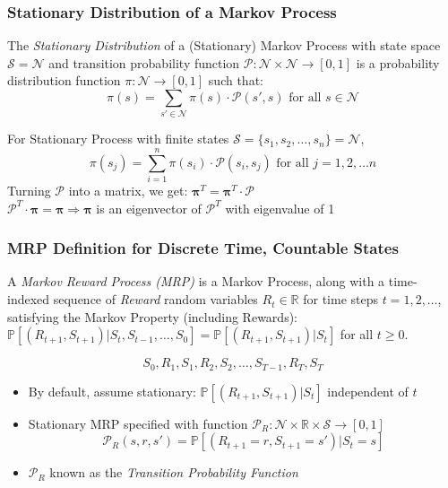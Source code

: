 \documentclass[handout]{beamer}
\begin{document}
\begin{frame}
\frametitle{Stationary Distribution of a Markov Process}
\pause
\begin{definition} 
 The {\em Stationary Distribution} of a (Stationary) Markov Process with state space $\mathcal{S} = \mathcal{N}$ and transition probability function $\mathcal{P}: \mathcal{N} \times \mathcal{N} \rightarrow [0, 1]$ is a probability distribution function $\pi: \mathcal{N} \rightarrow [0, 1]$ such that:
  $$\pi(s) = \sum_{s'\in \mathcal{N}} \pi(s) \cdot \mathcal{P}(s', s) \text{ for all } s \in \mathcal{N}$$
\end{definition}
\pause
For Stationary Process with finite states $\mathcal{S} = \{s_1, s_2, \ldots, s_n\} = \mathcal{N}$,
$$\pi(s_j) = \sum_{i=1}^n \pi(s_i) \cdot \mathcal{P}(s_i, s_j) \text{ for all } j = 1, 2, \ldots n$$
\pause
Turning $\mathcal{P}$ into a matrix, we get: $\bm{\pi}^T = \bm{\pi}^T \cdot \bm{\mathcal{P}}$\\
\pause
$\bm{\mathcal{P}}^T \cdot \bm{\pi}= \bm{\pi} \Rightarrow \bm{\pi}$ is an eigenvector of $\bm{\mathcal{P}}^T$ with eigenvalue of 1
\end{frame}


\begin{frame}
\frametitle{MRP Definition for Discrete Time, Countable States}
\pause
\begin{definition}
 A {\em Markov Reward Process (MRP)} is a Markov Process, along with a time-indexed sequence of {\em Reward} random variables $R_t \in \mathbb{R}$ for time steps $t=1, 2, \ldots$, satisfying the Markov Property (including Rewards): $\mathbb{P}[(R_{t+1}, S_{t+1}) | S_t, S_{t-1}, \ldots, S_0] = \mathbb{P}[(R_{t+1}, S_{t+1}) | S_t]$ for all $t \geq 0$.
 \end{definition}
 \pause
  $$S_0, R_1, S_1, R_2, S_2, \ldots, S_{T-1}, R_T, S_T$$
  \pause
 \begin{itemize}[<+->]
\item By default, assume stationary: $\mathbb{P}[(R_{t+1}, S_{t+1}) | S_t]$ independent of $t$
\item Stationary MRP specified with function $\mathcal{P}_R: \mathcal{N} \times \mathbb{R} \times \mathcal{S} \rightarrow [0,1]$
$$\mathcal{P}_R(s,r,s') = \mathbb{P}[(R_{t+1}=r, S_{t+1}=s') | S_t=s]$$
\item $\mathcal{P}_R$ known as the {\em Transition Probability Function}
\end{itemize}
\end{frame}
\end{document}
